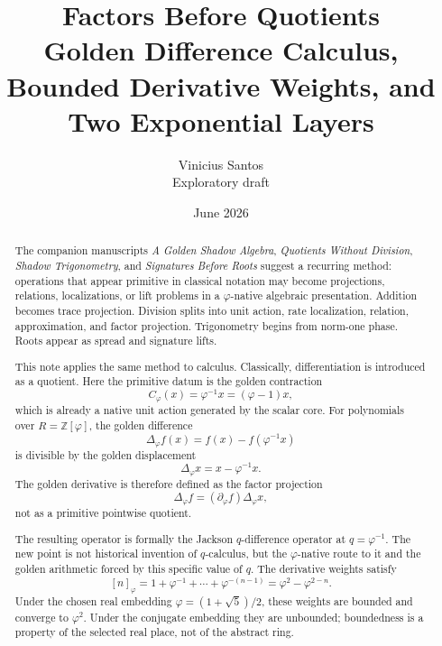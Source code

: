 \documentclass[11pt]{article}
\title{Factors Before Quotients\\
\large Golden Difference Calculus, Bounded Derivative Weights, and Two Exponential Layers}
\author{Vinicius Santos\\
\small Exploratory draft}
\date{June 2026}
\newcommand{\ph}{\varphi}
\newcommand{\Z}{\mathbb{Z}}
\newcommand{\dd}{\partial_{\ph}}
\newcommand{\Del}{\Delta_{\ph}}
\newcommand{\Cph}{C_{\ph}}
\begin{document}
\maketitle

\begin{abstract}
The companion manuscripts \emph{A Golden Shadow Algebra}, \emph{Quotients Without Division}, \emph{Shadow Trigonometry}, and \emph{Signatures Before Roots} suggest a recurring method: operations that appear primitive in classical notation may become projections, relations, localizations, or lift problems in a $\ph$-native algebraic presentation.  Addition becomes trace projection.  Division splits into unit action, rate localization, relation, approximation, and factor projection.  Trigonometry begins from norm-one phase.  Roots appear as spread and signature lifts.

This note applies the same method to calculus.  Classically, differentiation is introduced as a quotient.  Here the primitive datum is the golden contraction
\[
    \Cph(x)=\ph^{-1}x=(\ph-1)x,
\]
which is already a native unit action generated by the scalar core.  For polynomials over $R=\Z[\ph]$, the golden difference
\[
    \Del f(x)=f(x)-f(\ph^{-1}x)
\]
is divisible by the golden displacement
\[
    \Del x=x-\ph^{-1}x.
\]
The golden derivative is therefore defined as the factor projection
\[
    \Del f=(\dd f)\Del x,
\]
not as a primitive pointwise quotient.

The resulting operator is formally the Jackson $q$-difference operator at $q=\ph^{-1}$.  The new point is not historical invention of $q$-calculus, but the $\ph$-native route to it and the golden arithmetic forced by this specific value of $q$.  The derivative weights satisfy
\[
    [n]_{\ph}=1+\ph^{-1}+\cdots+\ph^{-(n-1)}
       =\ph^2-\ph^{2-n}.
\]
Under the chosen real embedding $\ph=(1+\sqrt5)/2$, these weights are bounded and converge to $\ph^2$.  Under the conjugate embedding they are unbounded; boundedness is a property of the selected real place, not of the abstract ring.


\end{abstract}
\end{document}
